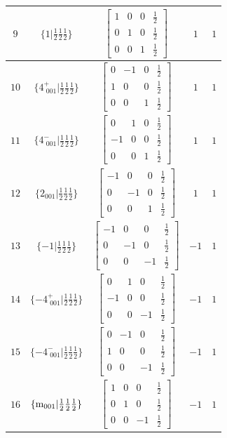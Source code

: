 \documentclass[fleqn,8pt]{jsarticle}
\begin{document}
\begin{longtable}{ccccc}
$ 9 $ & $ \{1|\frac{1}{2} \frac{1}{2} \frac{1}{2}\} $ & $ \begin{bmatrix} 1 & 0 & 0 & \frac{1}{2} \\ 0 & 1 & 0 & \frac{1}{2} \\ 0 & 0 & 1 & \frac{1}{2} \end{bmatrix} $ & $ 1 $ & $ 1 $ \\ \hline
$ 10 $ & $ \{4^{+}_{\,\,001}|\frac{1}{2} \frac{1}{2} \frac{1}{2}\} $ & $ \begin{bmatrix} 0 & -1 & 0 & \frac{1}{2} \\ 1 & 0 & 0 & \frac{1}{2} \\ 0 & 0 & 1 & \frac{1}{2} \end{bmatrix} $ & $ 1 $ & $ 1 $ \\ \hline
$ 11 $ & $ \{4^{-}_{\,\,001}|\frac{1}{2} \frac{1}{2} \frac{1}{2}\} $ & $ \begin{bmatrix} 0 & 1 & 0 & \frac{1}{2} \\ -1 & 0 & 0 & \frac{1}{2} \\ 0 & 0 & 1 & \frac{1}{2} \end{bmatrix} $ & $ 1 $ & $ 1 $ \\ \hline
$ 12 $ & $ \{2{}_{001}|\frac{1}{2} \frac{1}{2} \frac{1}{2}\} $ & $ \begin{bmatrix} -1 & 0 & 0 & \frac{1}{2} \\ 0 & -1 & 0 & \frac{1}{2} \\ 0 & 0 & 1 & \frac{1}{2} \end{bmatrix} $ & $ 1 $ & $ 1 $ \\ \hline
$ 13 $ & $ \{-1|\frac{1}{2} \frac{1}{2} \frac{1}{2}\} $ & $ \begin{bmatrix} -1 & 0 & 0 & \frac{1}{2} \\ 0 & -1 & 0 & \frac{1}{2} \\ 0 & 0 & -1 & \frac{1}{2} \end{bmatrix} $ & $ -1 $ & $ 1 $ \\ \hline
$ 14 $ & $ \{-4^{+}_{\,\,001}|\frac{1}{2} \frac{1}{2} \frac{1}{2}\} $ & $ \begin{bmatrix} 0 & 1 & 0 & \frac{1}{2} \\ -1 & 0 & 0 & \frac{1}{2} \\ 0 & 0 & -1 & \frac{1}{2} \end{bmatrix} $ & $ -1 $ & $ 1 $ \\ \hline
$ 15 $ & $ \{-4^{-}_{\,\,001}|\frac{1}{2} \frac{1}{2} \frac{1}{2}\} $ & $ \begin{bmatrix} 0 & -1 & 0 & \frac{1}{2} \\ 1 & 0 & 0 & \frac{1}{2} \\ 0 & 0 & -1 & \frac{1}{2} \end{bmatrix} $ & $ -1 $ & $ 1 $ \\ \hline
$ 16 $ & $ \{{\rm m}_{001}|\frac{1}{2} \frac{1}{2} \frac{1}{2}\} $ & $ \begin{bmatrix} 1 & 0 & 0 & \frac{1}{2} \\ 0 & 1 & 0 & \frac{1}{2} \\ 0 & 0 & -1 & \frac{1}{2} \end{bmatrix} $ & $ -1 $ & $ 1 $ \\
\end{longtable}
\end{document}
